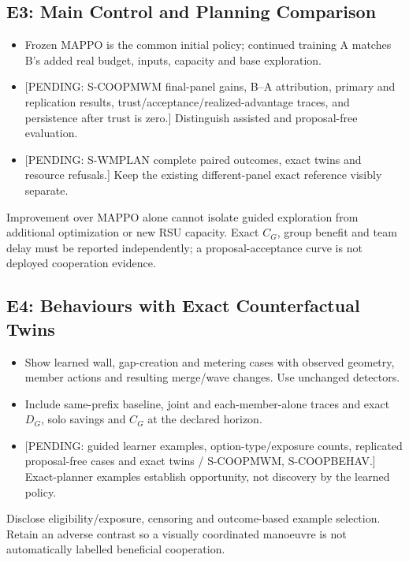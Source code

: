 \documentclass[conference]{IEEEtran}
\newcommand{\pending}[1]{\textcolor{red!80!black}{[PENDING: #1]}}
\newcommand{\blankpanel}[1]{\fbox{\rule{0pt}{#1}\rule{0.94\columnwidth}{0pt}}}
\begin{document}
\subsection{E3: Main Control and Planning Comparison}
\begin{itemize}
\item Frozen MAPPO is the common initial policy; continued training A matches
B's added real budget, inputs, capacity and base exploration.
\item \pending{S-COOPMWM final-panel gains, B--A attribution, primary and
replication results, trust/acceptance/realized-advantage traces, and persistence
after trust is zero.} Distinguish assisted and proposal-free evaluation.
\item \pending{S-WMPLAN complete paired outcomes, exact twins and resource
refusals.} Keep the existing different-panel exact reference visibly separate.
\end{itemize}
Improvement over MAPPO alone cannot isolate guided exploration from additional
optimization or new RSU capacity. Exact $C_G$, group benefit and team delay
must be reported independently; a proposal-acceptance curve is not deployed
cooperation evidence.

\begin{table}[t]
\caption{T1 plan: MAPPO; MAPPO+training A; MAPPO+WM-guided exploration B;
S-WMPLAN; exact-planner empirical upper reference; native reference.
Columns: paired J savings, $C_G$, $D_G$/solos, coverage, safety, real/model
compute and proposal/trust use at evaluation.
\pending{common-panel learned and WM-planning exports.}}
\centering\blankpanel{1.10in}
\label{tab:main}
\end{table}

\subsection{E4: Behaviours with Exact Counterfactual Twins}
\begin{itemize}
\item Show learned wall, gap-creation and metering cases with observed geometry,
member actions and resulting merge/wave changes. Use unchanged detectors.
\item Include same-prefix baseline, joint and each-member-alone traces and
exact $D_G$, solo savings and $C_G$ at the declared horizon.
\item \pending{guided learner examples, option-type/exposure counts,
replicated proposal-free cases and exact twins / S-COOPMWM, S-COOPBEHAV.}
Exact-planner examples establish
opportunity, not discovery by the learned policy.
\end{itemize}
Disclose eligibility/exposure, censoring and outcome-based example selection.
Retain an adverse contrast so a visually coordinated manoeuvre is not
automatically labelled beneficial cooperation.
\end{document}
